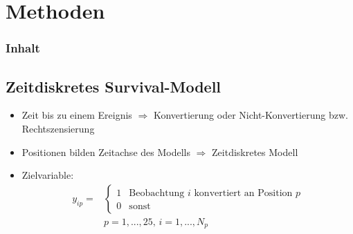 \section{Methoden}

\begin{frame}\frametitle{Inhalt}
\end{frame}

\subsection{Zeitdiskretes Survival-Modell}

\begin{frame}
	\begin{itemize}
		\item Zeit bis zu einem Ereignis $\Rightarrow$ Konvertierung oder Nicht-Konvertierung bzw. Rechtszensierung
		\item Positionen bilden Zeitachse des Modells $\Rightarrow$ Zeitdiskretes Modell
		\item Zielvariable:	
			\begin{align*}
				y_{ip} =& \begin{cases} 1 & \text{Beobachtung } i \text{ konvertiert an Position } p\\
															 0 & \text{sonst} 
								 \end{cases}\\
								&p=1,...,25 \text{, } i=1,...,N_p 
			\end{align*}	
	\end{itemize}
\end{frame}

